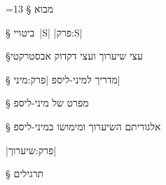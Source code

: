 \newcommand{\TopAlign}[1]{\adjustbox{valign=t}{#1}}

{%
    \makeatletter
    =13\relax%
    \gdef\fixNewLine{%
        \def^^M{\space}%
    }%
}
§ מבוא


§ ביטויי~\E|S|
|פרק:S|


§עצי שיערוך ועצי דקדוק אבסטרקטי


§ מדריך למיני-ליספ 
|פרק:מיני|


§ מפרט של מיני-ליספ


§ אלגוריתם השיערוך ומימושו במיני-ליספ 

|פרק:שיערוך|

§ תרגילים

